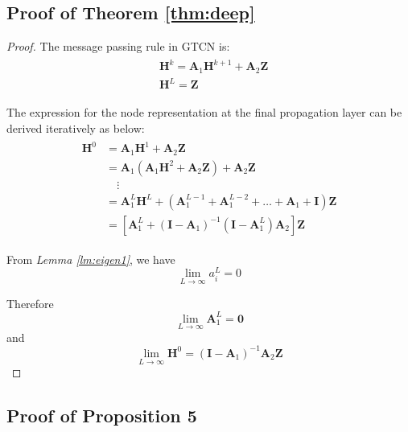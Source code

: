 \documentclass[lettersize,journal]{IEEEtran}
\theoremstyle{plain}
\theoremstyle{definition}
\theoremstyle{remark}
\begin{document}
\subsection{Proof of Theorem \ref{thm:deep}}
\begin{proof}
	The message passing rule in GTCN is:
	\begin{align}
		\begin{split}
			&\bm{H}^k = \bm{A}_1 \bm{H}^{k+1} + \bm{A}_2 \bm{Z} \\
			&\bm{H}^L = \bm{Z}
		\end{split}
	\end{align}

The expression for the node representation at the final propagation layer can be derived iteratively as below:
\begin{align}
\begin{split}
	\bm{H}^0 &= \bm{A}_1 \bm{H}^1 + \bm{A}_2 \bm{Z} \\
	&= \bm{A}_1 \left(\bm{A}_1 \bm{H}^2 + \bm{A}_2 \bm{Z} \right) + \bm{A}_2 \bm{Z} \\
	&\quad \vdots \\
	&= \bm{A}_1^L \bm{H}^L + \left(\bm{A}_1^{L-1} + \bm{A}_1^{L-2} + \ldots + \bm{A}_1 + \bm{I}\right)\bm{Z}\\
	&= \left[\bm{A}_1^L + \left(\bm{I} - \bm{A}_1\right)^{-1} \left( \bm{I} - \bm{A}_1^L \right) \bm{A}_2 \right] \bm{Z}
\end{split}
\end{align}

From \textit{Lemma \ref{lm:eigen1}}, we have
\begin{equation}
	\lim\limits_{L \to \infty} a_i^L = 0
\end{equation}

Therefore
\begin{equation}
	\lim\limits_{L \to \infty} \bm{A}_1^L = \bm{0}
\end{equation}
and
\begin{equation}
	\lim\limits_{L \to \infty} \bm{H}^0 = \left(\bm{I} - \bm{A}_1\right)^{-1} \bm{A}_2 \bm{Z}
\end{equation}
\end{proof}

\subsection{Proof of Proposition 5}
\end{document}

